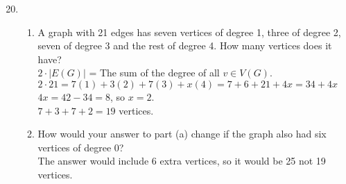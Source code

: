 \documentclass[12pt]{article}
\begin{document}
\begin{enumerate}
\setcounter{enumi}{19}
\item 
	\begin{enumerate}
	\item A graph with 21 edges has seven vertices of degree 1, three of degree 2, seven of degree 3 and the rest of degree 4. 
	How many vertices does it have?\\
		$2\cdot |E(G)|$ = The sum of the degree of all $v\in V(G)$.\\
		$2\cdot 21 = 7(1)+3(2)+7(3)+x(4)=7+6+21+4x=34+4x$\\
		$4x=42-34=8$, so $x=2$.\\
		$7+3+7+2=19$ vertices.
	\item How would your answer to part (a) change if the graph also had six vertices of degree 0?\\
		The answer would include 6 extra vertices, so it would be 25 not 19 vertices.
	\end{enumerate}
\end{enumerate}

\end{document}
